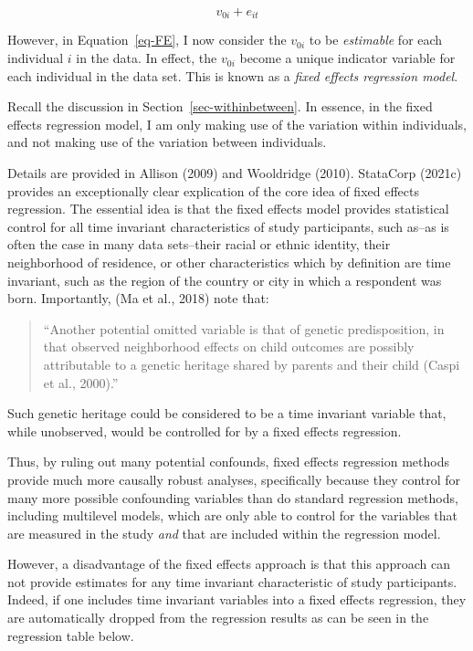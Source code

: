 \documentclass[
  letterpaper,
  DIV=11,
  numbers=noendperiod]{scrreprt}
\begin{document}
\[v_{0i} + e_{it}\]

However, in Equation~\ref{eq-FE}, I now consider the \(v_{0i}\) to be
\emph{estimable} for each individual \(i\) in the data. In effect, the
\(v_{0i}\) become a unique indicator variable for each individual in the
data set. This is known as a \emph{fixed effects regression model}.

Recall the discussion in Section~\ref{sec-withinbetween}. In essence, in
the fixed effects regression model, I am only making use of the
variation within individuals, and not making use of the variation
between individuals.

Details are provided in Allison (2009) and Wooldridge (2010). StataCorp
(2021c) provides an exceptionally clear explication of the core idea of
fixed effects regression. The essential idea is that the fixed effects
model provides statistical control for all time invariant
characteristics of study participants, such as--as is often the case in
many data sets--their racial or ethnic identity, their neighborhood of
residence, or other characteristics which by definition are time
invariant, such as the region of the country or city in which a
respondent was born. Importantly, (Ma et al., 2018) note that:

\begin{quote}
``Another potential omitted variable is that of genetic predisposition,
in that observed neighborhood effects on child outcomes are possibly
attributable to a genetic heritage shared by parents and their child
(Caspi et al., 2000).''
\end{quote}

Such genetic heritage could be considered to be a time invariant
variable that, while unobserved, would be controlled for by a fixed
effects regression.

Thus, by ruling out many potential confounds, fixed effects regression
methods provide much more causally robust analyses, specifically because
they control for many more possible confounding variables than do
standard regression methods, including multilevel models, which are only
able to control for the variables that are measured in the study
\emph{and} that are included within the regression model.

However, a disadvantage of the fixed effects approach is that this
approach can not provide estimates for any time invariant characteristic
of study participants. Indeed, if one includes time invariant variables
into a fixed effects regression, they are automatically dropped from the
regression results as can be seen in the regression table below.
\end{document}
